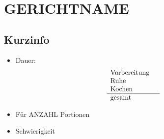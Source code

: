 \section{GERICHTNAME}
  \label{GERICHTTYPE:GERICHTNAME}
    

    \subsection*{Kurzinfo}
      \begin{itemize}
        \item Dauer:
          \begin{displaymath}
            \begin{array}{l r}
              \text{Vorbereitung} & \\
              \text{Ruhe} & \\
              \text{Kochen} & \\ \hline
              \text{gesamt} &
            \end{array}
          \end{displaymath}
        \item Für ANZAHL Portionen
        \item Schwierigkeit
      \end{itemize}

